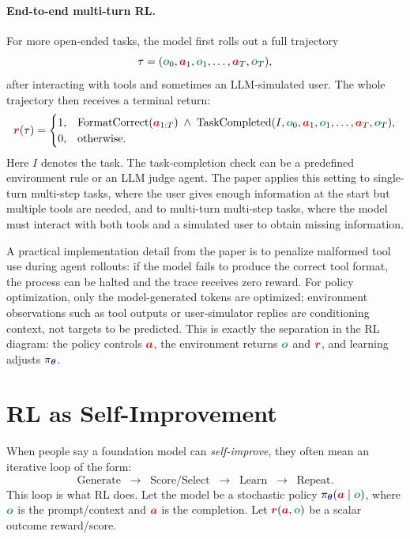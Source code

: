 \documentclass{article}
\newcommand{\colsym}[2]{\ensuremath{\textcolor{#1}{\boldsymbol{#2}}}}
\newcommand{\action}{\colsym{red}{a}}
\newcommand{\obs}{\colsym{ForestGreen}{o}}
\newcommand{\reward}{\colsym{purple}{r}}
\newcommand{\params}{\colsym{blue}{\theta}}
\begin{document}
\paragraph{End-to-end multi-turn RL.}
For more open-ended tasks, the model first rolls out a full trajectory
\[
    \tau = ({\obs}_0,{\action}_1,{\obs}_1,\ldots,{\action}_T,{\obs}_T),
\]
after interacting with tools and sometimes an LLM-simulated user.
The whole trajectory then receives a terminal return:
\[
    {\reward}(\tau)
    =
    \begin{cases}
    1, & \mathrm{FormatCorrect}({\action}_{1:T})
         \;\wedge\;
         \mathrm{TaskCompleted}(I,{\obs}_0,{\action}_1,{\obs}_1,\ldots,{\action}_T,{\obs}_T), \\
    0, & \mathrm{otherwise}.
    \end{cases}
\]
Here $I$ denotes the task. The task-completion check can be a predefined environment rule or an LLM judge agent. The paper applies this setting to single-turn multi-step tasks, where the user gives enough information at the start but multiple tools are needed, and to multi-turn multi-step tasks, where the model must interact with both tools and a simulated user to obtain missing information.

A practical implementation detail from the paper is to penalize malformed tool use during agent rollouts: if the model fails to produce the correct tool format, the process can be halted and the trace receives zero reward.
For policy optimization, only the model-generated tokens are optimized; environment observations such as tool outputs or user-simulator replies are conditioning context, not targets to be predicted.
This is exactly the separation in the RL diagram: the policy controls ${\action}$, the environment returns ${\obs}$ and ${\reward}$, and learning adjusts $\pi_{\params}$.







\section{RL as Self-Improvement}
\label{sec:self_improvement_is_rl}

When people say a foundation model can \emph{self-improve}, they often mean an iterative loop of the form:
\[
\text{Generate} \;\;\rightarrow\;\; \text{Score/Select} \;\;\rightarrow\;\; \text{Learn} \;\;\rightarrow\;\; \text{Repeat}.
\]
This loop is what RL does. 
Let the model be a stochastic policy $\pi_{\params}(\action \mid \obs)$, where $\obs$ is the prompt/context and $\action$ is the completion. Let $\reward(\action,\obs)$ be a scalar outcome reward/score.
\end{document}
